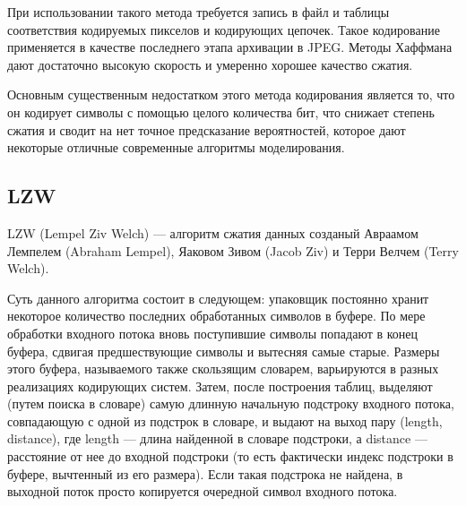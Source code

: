При использовании такого метода требуется запись в файл и таблицы
соответствия кодируемых пикселов и кодирующих цепочек. Такое кодирование
применяется в качестве последнего этапа архивации в JPEG. Методы Хаффмана
дают достаточно высокую скорость и умеренно хорошее качество сжатия.

	Основным существенным недостатком этого метода кодирования является то, что он кодирует символы с помощью целого количества бит, что снижает степень сжатия и сводит на нет точное предсказание вероятностей, которое дают некоторые отличные современные алгоритмы моделирования. \cite{haff2}
    
    \subsection{LZW}
    
    LZW (Lempel Ziv Welch) --- алгоритм сжатия данных созданый  Авраамом Лемпелем (Abraham Lempel), Яаковом Зивом (Jacob Ziv) и Терри Велчем (Terry Welch). 
    
    
    Суть данного алгоритма состоит в следующем: упаковщик постоянно
хранит некоторое количество последних обработанных символов в буфере. По
мере обработки входного потока вновь поступившие символы попадают в
конец буфера, сдвигая предшествующие символы и вытесняя самые старые.
Размеры этого буфера, называемого также скользящим словарем, варьируются
в разных реализациях кодирующих систем. Затем, после построения 
таблиц, выделяют (путем поиска в словаре) самую длинную начальную
подстроку входного потока, совпадающую с одной из подстрок в словаре, и
выдают на выход пару (length, distance), где length --- длина найденной в словаре
подстроки, а distance --- расстояние от нее до входной подстроки (то есть
фактически индекс подстроки в буфере, вычтенный из его размера). Если такая
подстрока не найдена, в выходной поток просто копируется очередной символ
входного потока. \cite{LZW}

